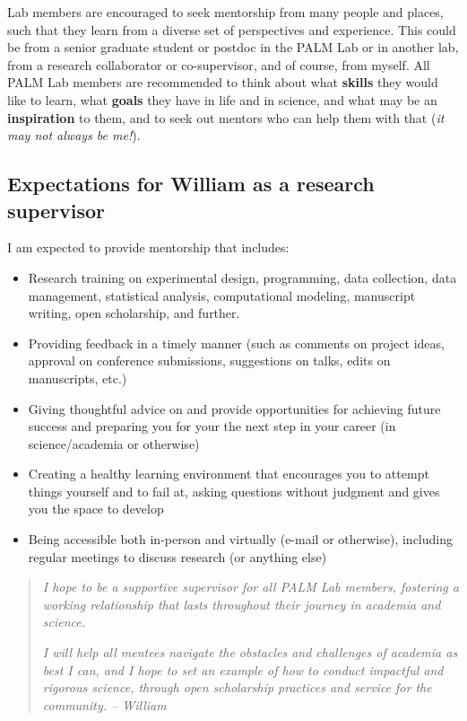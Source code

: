 \documentclass[
]{book}
\providecommand{\tightlist}{%
  \setlength{\itemsep}{0pt}\setlength{\parskip}{0pt}}
\begin{document}
Lab members are encouraged to seek mentorship from many people and places, such that they learn from a diverse set of perspectives and experience. This could be from a senior graduate student or postdoc in the PALM Lab or in another lab, from a research collaborator or co-supervisor, and of course, from myself. All PALM Lab members are recommended to think about what \textbf{skills} they would like to learn, what \textbf{goals} they have in life and in science, and what may be an \textbf{inspiration} to them, and to seek out mentors who can help them with that (\emph{it may not always be me!}).

\hypertarget{will-mentor}{%
\subsection{Expectations for William as a research supervisor}\label{will-mentor}}

I am expected to provide mentorship that includes:

\begin{itemize}
\tightlist
\item
  Research training on experimental design, programming, data collection, data management, statistical analysis, computational modeling, manuscript writing, open scholarship, and further.
\item
  Providing feedback in a timely manner (such as comments on project ideas, approval on conference submissions, suggestions on talks, edits on manuscripts, etc.)
\item
  Giving thoughtful advice on and provide opportunities for achieving future success and preparing you for your the next step in your career (in science/academia or otherwise)
\item
  Creating a healthy learning environment that encourages you to attempt things yourself and to fail at, asking questions without judgment and gives you the space to develop
\item
  Being accessible both in-person and virtually (e-mail or otherwise), including regular meetings to discuss research (or anything else)
\end{itemize}

\begin{quote}
\emph{I hope to be a supportive supervisor for all PALM Lab members, fostering a working relationship that lasts throughout their journey in academia and science.}

\emph{I will help all mentees navigate the obstacles and challenges of academia as best I can, and I hope to set an example of how to conduct impactful and rigorous science, through open scholarship practices and service for the community. -- William}
\end{quote}
\end{document}

